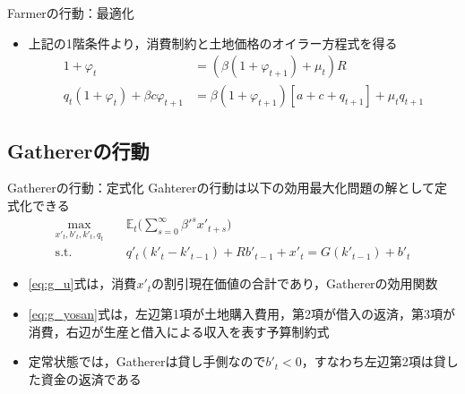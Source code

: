 \documentclass[aspectratio=169, dvipdfmx, 11pt, uplatex]{beamer}
\begin{document}
\begin{frame}{Farmerの行動：最適化}
  \begin{itemize}
    \item 上記の1階条件より，消費制約と土地価格のオイラー方程式を得る
      \begin{align}
        1 + \varphi_t &= (\beta(1+\varphi_{t+1}) + \mu_t) R \\
        q_t (1 + \varphi_t) + \beta c \varphi_{t+1} &= \beta(1 + \varphi_{t+1})[a + c + q_{t+1}] + \mu_t q_{t+1}
      \end{align}
  \end{itemize}
\end{frame}

\subsection{Gathererの行動}
\begin{frame}{Gathererの行動：定式化}
  Gahtererの行動は以下の効用最大化問題の解として定式化できる
  \begin{align}
    \max_{x'_t, b'_t, k'_t, q_t} \quad & \mathbb{E}_t \bigg( \sum_{s=0}^{\infty} \beta'^s x'_{t+s} \bigg) \label{eq:g_u} \\
\text{s.t.} \quad & q'_t(k'_t - k'_{t-1}) + R b'_{t-1} + x'_t = G(k'_{t-1}) + b'_t \label{eq:g_yosan}
  \end{align}
  \begin{itemize}
    \item \eqref{eq:g_u}式は，消費$x'_t$の割引現在価値の合計であり，Gathererの効用関数
    \item \eqref{eq:g_yosan}式は，左辺第1項が土地購入費用，第2項が借入の返済，第3項が消費，右辺が生産と借入による収入を表す予算制約式
    \item 定常状態では，Gathererは貸し手側なので$b'_t < 0$，すなわち左辺第2項は貸した資金の返済である
  \end{itemize}
\end{frame}
\end{document}
